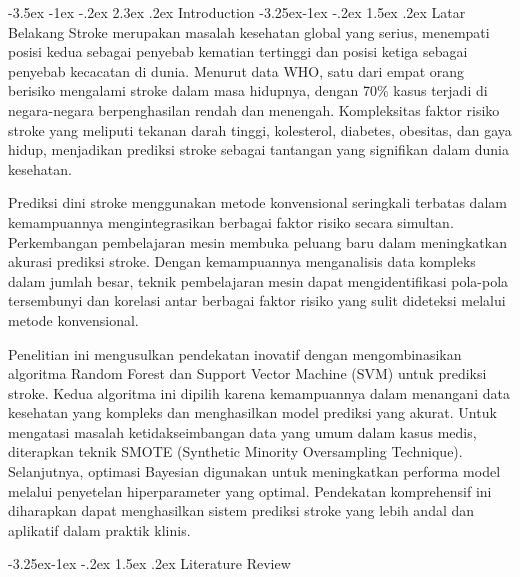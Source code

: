 \documentclass[10pt]{article}
\makeatletter
\renewcommand\section{\@startsection{section}{1}{\z@}%
  {-3.5ex \@plus -1ex \@minus -.2ex}%
  {2.3ex \@plus.2ex}%
  {\normalfont\normalsize\bfseries}}
\renewcommand\subsection{\@startsection{subsection}{2}{\z@}%
  {-3.25ex\@plus -1ex \@minus -.2ex}%
  {1.5ex \@plus .2ex}%
  {\normalfont\itshape\normalsize}}
\makeatother
\begin{document}
\begin{multicols}{2}
    \setlength{\columnsep}{0.4pt} %
    \raggedcolumns%
    \sloppy %

    \section{Introduction}
    \subsection{Latar Belakang}
    Stroke merupakan masalah kesehatan global yang serius, menempati posisi kedua
    sebagai penyebab kematian tertinggi dan posisi ketiga sebagai penyebab
    kecacatan di dunia. Menurut data WHO, satu dari empat orang berisiko mengalami
    stroke dalam masa hidupnya, dengan 70\% kasus terjadi di negara-negara
    berpenghasilan rendah dan menengah\cite{who2024stroke}. Kompleksitas faktor risiko
    stroke yang meliputi tekanan darah tinggi, kolesterol, diabetes, obesitas, dan
    gaya hidup, menjadikan prediksi stroke sebagai tantangan yang signifikan dalam
    dunia kesehatan.\cite{emon2020performance}

    Prediksi dini stroke menggunakan metode konvensional seringkali terbatas dalam
    kemampuannya mengintegrasikan berbagai faktor risiko secara simultan.
    Perkembangan pembelajaran mesin membuka peluang baru dalam meningkatkan akurasi
    prediksi stroke. Dengan kemampuannya menganalisis data kompleks dalam jumlah
    besar, teknik pembelajaran mesin dapat mengidentifikasi pola-pola tersembunyi
    dan korelasi antar berbagai faktor risiko yang sulit dideteksi melalui metode
    konvensional.

    Penelitian ini mengusulkan pendekatan inovatif dengan mengombinasikan algoritma
    Random Forest dan Support Vector Machine (SVM) untuk prediksi stroke. Kedua
    algoritma ini dipilih karena kemampuannya dalam menangani data kesehatan yang
    kompleks dan menghasilkan model prediksi yang akurat. Untuk mengatasi masalah
    ketidakseimbangan data yang umum dalam kasus medis, diterapkan teknik SMOTE
    (Synthetic Minority Oversampling Technique). Selanjutnya, optimasi Bayesian
    digunakan untuk meningkatkan performa model melalui penyetelan hiperparameter
    yang optimal. Pendekatan komprehensif ini diharapkan dapat menghasilkan sistem
    prediksi stroke yang lebih andal dan aplikatif dalam praktik klinis.

    \subsection{Literature Review}


\end{multicols}
\end{document}
